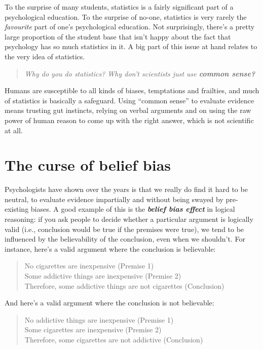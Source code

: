 \documentclass[
  11pt,
]{book}
\theoremstyle{indenteddefinition}
\theoremstyle{indenteddefinition}
\theoremstyle{definition}
\theoremstyle{definition}
\theoremstyle{remark}
\begin{document}
To the surprise of many students, statistics is a fairly significant part of a psychological education. To the surprise of no-one, statistics is very rarely the \emph{favourite} part of one's psychological education. Not surprisingly, there's a pretty large proportion of the student base that isn't happy about the fact that psychology has so much statistics in it. A big part of this issue at hand relates to the very idea of statistics.

\begin{quote}
\emph{Why do you do statistics? Why don't scientists just use \textbf{common sense?}}
\end{quote}

Humans are susceptible to all kinds of biases, temptations and frailties, and much of statistics is basically a safeguard. Using ``common sense'' to evaluate evidence means trusting gut instincts, relying on verbal arguments and on using the raw power of human reason to come up with the right answer, which is not scientific at all.

\hypertarget{the-curse-of-belief-bias}{%
\section{The curse of belief bias}\label{the-curse-of-belief-bias}}

Psychologists have shown over the years is that we really do find it hard to be neutral, to evaluate evidence impartially and without being swayed by pre-existing biases. A good example of this is the \textbf{\emph{belief bias effect}} in logical reasoning: if you ask people to decide whether a particular argument is logically valid (i.e., conclusion would be true if the premises were true), we tend to be influenced by the believability of the conclusion, even when we shouldn't. For instance, here's a valid argument where the conclusion is believable:

\begin{quote}
No cigarettes are inexpensive (Premise 1)\\
Some addictive things are inexpensive (Premise 2)\\
Therefore, some addictive things are not cigarettes (Conclusion)
\end{quote}

And here's a valid argument where the conclusion is not believable:

\begin{quote}
No addictive things are inexpensive (Premise 1)\\
Some cigarettes are inexpensive (Premise 2)\\
Therefore, some cigarettes are not addictive (Conclusion)
\end{quote}
\end{document}
